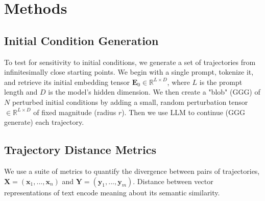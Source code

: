 \documentclass[a4paper,12pt]{article}
\begin{document}



\section{Methods}

\subsection{Initial Condition Generation}
To test for sensitivity to initial conditions, we generate a set of trajectories from infinitesimally close starting points. We begin with a single prompt, tokenize it, and retrieve its initial embedding tensor $\mathbf{E}_0 \in \mathbb{R}^{L \times D}$, where $L$ is the prompt length and $D$ is the model's hidden dimension. We then create a "blob" (GGG) of $N$ perturbed initial conditions by adding a small, random perturbation tensor $\in \mathbb{R}^{L \times D}$ of fixed magnitude (radius $r$). Then we use LLM to continue (GGG generate) each trajectory.

\subsection{Trajectory Distance Metrics}
We use a suite of metrics to quantify the divergence between pairs of trajectories, $\mathbf{X} = (\mathbf{x}_1, ..., \mathbf{x}_n)$ and $\mathbf{Y} = (\mathbf{y}_1, ..., \mathbf{y}_m)$. Distance between vector representations of text encode meaning about its semantic similarity.
\end{document}
